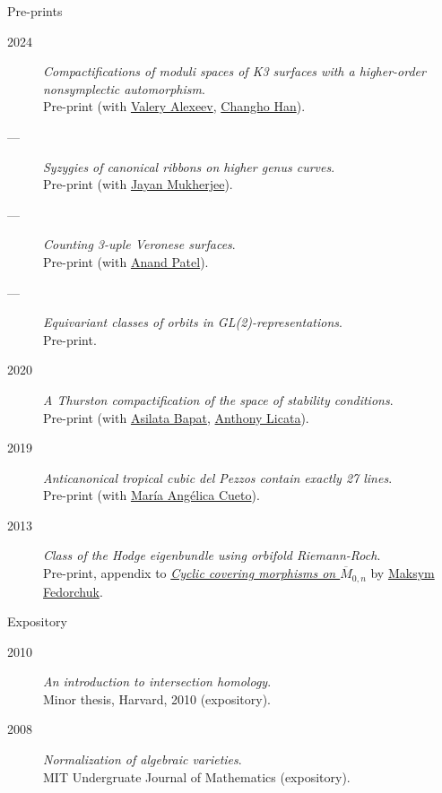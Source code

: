 \documentclass[11pt]{article}
\begin{document}
\begin{description}
\item[{Pre-prints}] 
\end{description}
\label{orgafe52d1}
\begin{description}
\item[{2024}] \emph{Compactifications of moduli spaces of K3 surfaces with a higher-order nonsymplectic automorphism}.\\
Pre-print (with \href{https://www.math.uga.edu/directory/people/valery-alexeev}{Valery Alexeev}, \href{https://sites.google.com/view/changho-han/}{Changho Han}).
\item[{---}] \emph{Syzygies of canonical ribbons on higher genus curves}.\\
Pre-print (with \href{https://sites.google.com/view/mukherjeejayan}{Jayan Mukherjee}).
\item[{---}] \emph{Counting 3-uple Veronese surfaces}.\\
Pre-print (with \href{https://sites.google.com/view/anand-patel}{Anand Patel}).
\item[{---}] \emph{Equivariant classes of orbits in GL(2)-representations}.\\
Pre-print.
\item[{2020}] \emph{A Thurston compactification of the space of stability conditions}.\\
Pre-print (with \href{https://asilata.org/}{Asilata Bapat}, \href{https://maths-people.anu.edu.au/\~licatat/}{Anthony Licata}).
\item[{2019}] \emph{Anticanonical tropical cubic del Pezzos contain exactly 27 lines}.\\
Pre-print (with \href{https://people.math.osu.edu/cueto.5/}{María Angélica Cueto}).
\item[{2013}] \emph{Class of the Hodge eigenbundle using orbifold Riemann-Roch}.\\
Pre-print, appendix to \href{https://drive.google.com/file/d/1wq-Fh3DiqODc51t-J0phIexVF7B4lxsY/view}{\emph{Cyclic covering morphisms on \(\overline M_{0,n}\)}} by \href{https://www2.bc.edu/maksym-fedorchuk/}{Maksym Fedorchuk}.
\end{description}

\begin{description}
\item[{Expository}] 
\end{description}
\label{orgce1a359}
\begin{description}
\item[{2010}] \emph{An introduction to intersection homology}.\\
Minor thesis, Harvard, 2010 (expository).
\item[{2008}] \emph{Normalization of algebraic varieties}.\\
MIT Undergruate Journal of Mathematics (expository).
\end{description}
\end{document}
